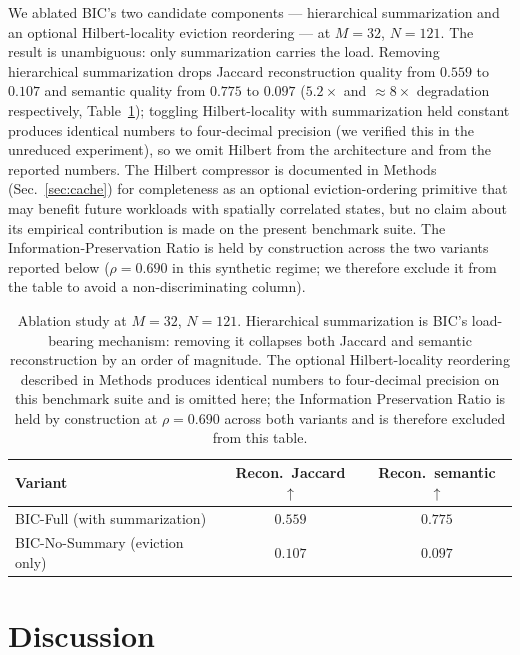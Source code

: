 \documentclass[fleqn,10pt]{article}
\theoremstyle{definition}
\newcommand{\preserv}{\rho}
\newcommand{\slots}{M}
\begin{document}
We ablated BIC's two candidate components --- hierarchical
summarization and an optional Hilbert-locality eviction reordering
--- at $\slots{=}32$, $N{=}121$. The result is unambiguous: only
summarization carries the load. Removing hierarchical summarization
drops Jaccard reconstruction quality from $0.559$ to $0.107$ and
semantic quality from $0.775$ to $0.097$ ($5.2\times$ and $\approx
8\times$ degradation respectively, Table~\ref{tab:ablation});
toggling Hilbert-locality with summarization held constant produces
identical numbers to four-decimal precision (we verified this in the
unreduced experiment), so we omit Hilbert from the architecture and
from the reported numbers. The Hilbert compressor is documented in
Methods (Sec.~\ref{sec:cache}) for completeness as an optional
eviction-ordering primitive that may benefit future workloads with
spatially correlated states, but no claim about its empirical
contribution is made on the present benchmark suite. The
Information-Preservation Ratio is held by construction across the
two variants reported below ($\preserv = 0.690$ in this synthetic
regime; we therefore exclude it from the table to avoid a
non-discriminating column).

\begin{table}[t]
\centering
\caption{Ablation study at $\slots{=}32$, $N{=}121$. Hierarchical
summarization is BIC's load-bearing mechanism: removing it
collapses both Jaccard and semantic reconstruction by an order of
magnitude. The optional Hilbert-locality reordering described in
Methods produces identical numbers to four-decimal precision on
this benchmark suite and is omitted here; the Information
Preservation Ratio is held by construction at $\preserv = 0.690$
across both variants and is therefore excluded from this table.
\label{tab:ablation}}
\begin{tabular}{lcc}
\toprule
\textbf{Variant} & \textbf{Recon.\ Jaccard} $\uparrow$ &
\textbf{Recon.\ semantic} $\uparrow$ \\
\midrule
BIC-Full (with summarization)    & $\mathbf{0.559}$ & $\mathbf{0.775}$ \\
BIC-No-Summary (eviction only)   & $0.107$         & $0.097$ \\
\bottomrule
\end{tabular}
\end{table}

\section*{Discussion}
\end{document}
